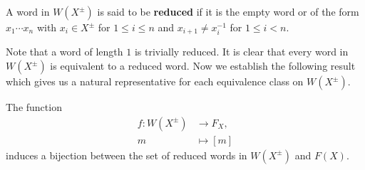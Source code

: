 \begin{definition}
	A word in $W(X^{\pm})$ is said to be \textbf{reduced} if it is the empty word or of the form $x_1 \cdots x_n$ with $x_i \in X^{\pm}$ for $1 \leq i \leq n$ and $x_{i+1} \neq x_i^{-1}$ for $1 \leq i < n$.
\end{definition}
Note that a word of length $1$ is trivially reduced.  It is clear that every word in $W(X^{\pm})$ is equivalent to a reduced word. Now we establish the following result which gives us a natural representative for each equivalence class on $W(X^{\pm})$.
\begin{theorem} \label{thm-bijection-red-words-and-free-group}
	The function 
	\begin{align*}
		f:W(X^{\pm}) &\to F_X, 
		\\
		m &\mapsto [m]
	\end{align*}  induces a bijection between the set of reduced words in $W(X^\pm)$ and $F(X)$.
\end{theorem}
